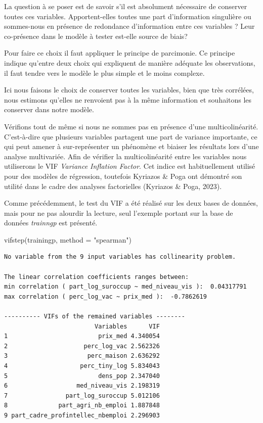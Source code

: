 \documentclass[
  french,
  11pt,
  a4paper,
]{article}
\newenvironment{Shaded}{}{}
\newcommand{\AttributeTok}[1]{\textcolor[rgb]{0.84,0.23,0.29}{#1}}
\newcommand{\FunctionTok}[1]{\textcolor[rgb]{0.44,0.26,0.76}{#1}}
\newcommand{\NormalTok}[1]{\textcolor[rgb]{0.14,0.16,0.18}{#1}}
\newcommand{\StringTok}[1]{\textcolor[rgb]{0.01,0.18,0.38}{#1}}
\begin{document}
La question à se poser est de savoir s'il est absolument nécessaire de
conserver toutes ces variables. Apportent-elles toutes une part
d'information singulière ou sommes-nous en présence de redondance
d'information entre ces variables ? Leur co-présence dans le modèle à
tester est-elle source de biais?

Pour faire ce choix il faut appliquer le principe de parcimonie. Ce
principe indique qu'entre deux choix qui expliquent de manière adéquate
les observations, il faut tendre vers le modèle le plus simple et le
moins complexe.

Ici nous faisons le choix de conserver toutes les variables, bien que
très corrélées, nous estimons qu'elles ne renvoient pas à la même
information et souhaitons les conserver dans notre modèle.

Vérifions tout de même si nous ne sommes pas en présence d'une
multicolinéarité. C'est-à-dire que plusieurs variables partagent une
part de variance importante, ce qui peut amener à sur-représenter un
phénomène et biaiser les résultats lors d'une analyse multivariée. Afin
de vérifier la multicolinéarité entre les variables nous utiliserons le
VIF \emph{Variance Inflation Factor}. Cet indice est habituellement
utilisé pour des modèles de régression, toutefois Kyriazos \& Poga ont
démontré son utilité dans le cadre des analyses factorielles (Kyriazos
\& Poga, 2023).

Comme précédemment, le test du VIF a été réalisé sur les deux bases de
données, mais pour ne pas alourdir la lecture, seul l'exemple portant
sur la base de données \emph{trainngp} est présenté.

\begin{Shaded}
\begin{Highlighting}[]
\FunctionTok{vifstep}\NormalTok{(trainingp, }\AttributeTok{method =} \StringTok{"spearman"}\NormalTok{)}
\end{Highlighting}
\end{Shaded}

\begin{verbatim}
No variable from the 9 input variables has collinearity problem. 

The linear correlation coefficients ranges between: 
min correlation ( part_log_suroccup ~ med_niveau_vis ):  0.04317791 
max correlation ( perc_log_vac ~ prix_med ):  -0.7862619 

---------- VIFs of the remained variables -------- 
                         Variables      VIF
1                         prix_med 4.340054
2                     perc_log_vac 2.562326
3                      perc_maison 2.636292
4                    perc_tiny_log 5.834043
5                         dens_pop 2.347040
6                   med_niveau_vis 2.198319
7                part_log_suroccup 5.012106
8              part_agri_nb_emploi 1.887848
9 part_cadre_profintellec_nbemploi 2.296903
\end{verbatim}
\end{document}
